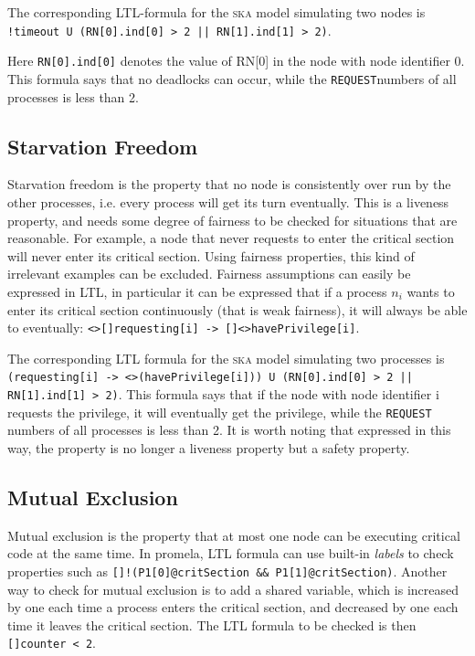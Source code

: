\documentclass[a4paper,10pt]{llncs}
\begin{document}
The corresponding LTL-formula for the \textsc{ska} model simulating two nodes is
\texttt{!timeout U (RN[0].ind[0] > 2 || RN[1].ind[1] > 2)}.

Here \texttt{RN[0].ind[0]} denotes the value of RN[0] in the node with node identifier 0. This formula says that no deadlocks can occur, while the \texttt{REQUEST}numbers of all processes is less than 2.

\subsection{Starvation Freedom}
Starvation freedom is the property that no node is consistently over run by the other processes, i.e. every process will get its turn eventually. This is a liveness property, and needs some degree of fairness to be checked for situations that are reasonable. For example, a node that never requests to enter the critical section will never enter its critical section. Using fairness properties, this kind of irrelevant examples can be excluded. Fairness assumptions can easily be expressed in LTL, in particular it can be expressed that if a process $n_i$ wants to enter its critical section continuously (that is weak fairness), it will always be able to eventually: \texttt{<>[]requesting[i] -> []<>havePrivilege[i]}.

The corresponding LTL formula for the \textsc{ska} model simulating two processes is \texttt{(requesting[i] -> <>(havePrivilege[i])) U (RN[0].ind[0] > 2 || RN[1].ind[1] > 2)}. This formula says that if the node with node identifier i requests the privilege, it will eventually get the privilege, while the \texttt{REQUEST} numbers of all processes is less than 2. It is worth noting that expressed in this way, the property is no longer a liveness property but a safety property.


\subsection{Mutual Exclusion}
Mutual exclusion is the property that at most one node can be executing critical code at the same time. In promela, LTL formula can use built-in \emph{labels} to check properties such as \texttt{[]!(P1[0]@critSection \&\& P1[1]@critSection)}. Another way to check for mutual exclusion is to add a shared variable, which is increased by one each time a process enters the critical section, and decreased by one each time it leaves the critical section. The LTL formula to be checked is then \texttt{[]counter < 2}.
\end{document}
